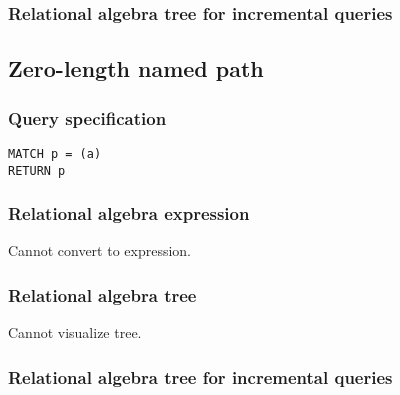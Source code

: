 
\subsubsection*{Relational algebra tree for incremental queries}


\subsection{Zero-length named path}

\subsubsection*{Query specification}

\begin{lstlisting}
MATCH p = (a)
RETURN p
\end{lstlisting}

\subsubsection*{Relational algebra expression}

Cannot convert to expression.

\subsubsection*{Relational algebra tree}

Cannot visualize tree.

\subsubsection*{Relational algebra tree for incremental queries}

